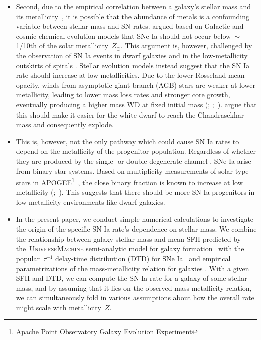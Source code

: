 \documentclass[ms.tex]{subfiles}
\begin{document}
\begin{itemize}
	\item Second, due to the empirical correlation between a galaxy's stellar
	mass and its metallicity~\citep{Tremonti2004}, it is possible that the
	abundance of metals is a confounding variable between stellar mass and
	SN rates.
	\citet{Kobayashi1998} argued based on Galactic and cosmic chemical
	evolution models that SNe Ia should not occur below~$\sim$1/10th of the
	solar metallicity~$Z_\odot$.
	This argument is, however, challenged by the observation of SN Ia events in
	dwarf galaxies and in the low-metallicity outskirts of spirals
	\citep[e.g.][]{Prieto2008}.
	Stellar evolution models instead suggest that the SN Ia rate should
	increase at low metallicities.
	Due to the lower Rosseland mean opacity, winds from asymptotic giant branch
	(AGB) stars are weaker at lower metallicity, leading to lower mass loss
	rates and stronger core growth, eventually producing a higher mass WD at
	fixed initial mass (\citealp{Umeda1999, Willson2000, Marigo2007};
	\citealp*{Meng2008};~\citealp{Zhao2012, Kalirai2014}).
	\citet{Kistler2013} argue that this should make it easier for the white
	dwarf to reach the Chandrasekhar mass and consequently explode.

	\item This is, however, not the only pathway which could cause SN Ia rates
	to depend on the metallicity of the progenitor population.
	Regardless of whether they are produced by the single-
	\citep[e.g.][]{Whelan1973} or double-degenerate channel
	\citep[e.g.][]{Iben1984, Webbink1984}, SNe Ia arise from binary star
	systems.
	Based on multiplicity measurements of solar-type stars in APOGEE\footnote{
		Apache Point Observatory Galaxy Evolution Experiment
	}~\citep{Majewski2017}, the close binary fraction is known to increase
	at low metallicity (\citealp{Badenes2018};~\citealp*{Moe2019}).
	This suggests that there should be more SN Ia progenitors in low
	metallicity environments like dwarf galaxies.

	\item In the present paper, we conduct simple numerical calculations to
	investigate the origin of the specific SN Ia rate's dependence on stellar
	mass.
	We combine the relationship between galaxy stellar mass and mean SFH
	predicted by the~\textsc{UniverseMachine} semi-analytic model for galaxy
	formation~\citep{Behroozi2019} with the popular~$\tau^{-1}$ delay-time
	distribution (DTD) for SNe Ia~\citep[e.g.][]{Maoz2012} and empirical
	parametrizations of the mass-metallicity relation for galaxies
	\citep{Andrews2013, Zahid2014}.
	With a given SFH and DTD, we can compute the SN Ia rate for a galaxy of
	some stellar mass, and by assuming that it lies on the observed
	mass-metallicity relation, we can simultaneously fold in various
	assumptions about how the overall rate might scale with metallicity~$Z$.

\end{itemize}
\end{document}
